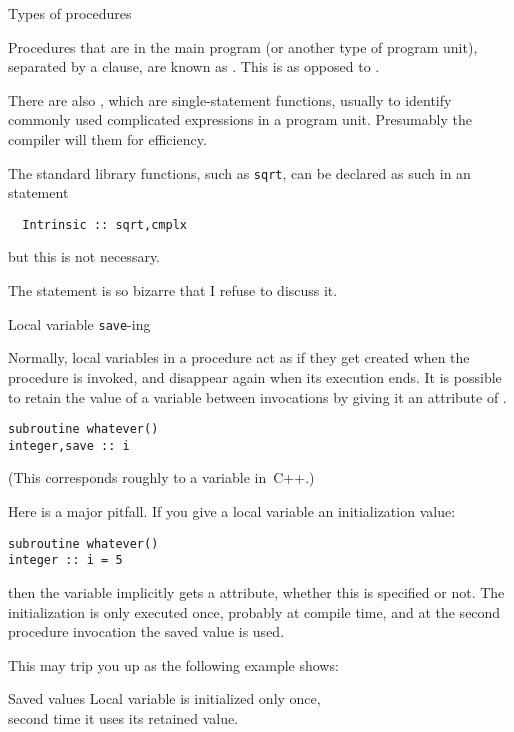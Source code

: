  {Types of procedures}

Procedures that are in the main program (or another type of program
unit), separated by a  clause, are known as
. This is as opposed to
.

There are also , which are
single-statement functions, usually to identify commonly used
complicated expressions in a program unit. Presumably the compiler
will  them for efficiency.

The standard library functions, such as \lstinline+sqrt+,
can be declared as such in an  statement
\begin{lstlisting}
  Intrinsic :: sqrt,cmplx
\end{lstlisting}
but this is not necessary.

The  statement is so bizarre that I refuse to discuss it.

 {Local variable \texttt{save}-ing}
\label{sec:f-save-var}

Normally, local variables in a procedure act as if they
get created when the procedure is invoked,
and disappear again when its execution ends.
It is possible to retain the value of a variable
between invocations by giving it an attribute of .
\begin{lstlisting}
subroutine whatever()
integer,save :: i
\end{lstlisting}
(This corresponds roughly to a  variable in~C++.)

Here is a major pitfall.
If you give a local variable an initialization value:
\begin{lstlisting}
subroutine whatever()
integer :: i = 5
\end{lstlisting}
then the variable implicitly gets a  attribute,
whether this is specified or not.
The initialization is only executed once,
probably at compile time,
and at the second procedure invocation
the saved value is used.

This may trip you up as the following example shows:

\begin{block}{Saved values}
  \label{sl:func-param-save}
  Local variable is initialized only once,\\
  second time it uses its retained value.
  
\end{block}


